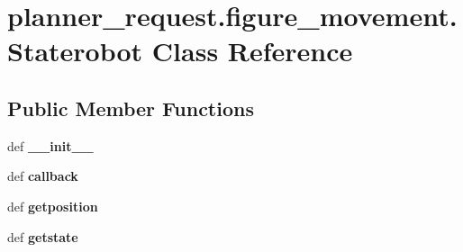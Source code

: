 \hypertarget{classplanner__request_1_1figure__movement_1_1_staterobot}{\section{planner\-\_\-request.\-figure\-\_\-movement.\-Staterobot \-Class \-Reference}
\label{classplanner__request_1_1figure__movement_1_1_staterobot}
}
\subsection*{\-Public \-Member \-Functions}
\begin{DoxyCompactItemize}
\item 
\hypertarget{classplanner__request_1_1figure__movement_1_1_staterobot_a55515374f53a462c7da7254240080a5d}{def {\bfseries \-\_\-\-\_\-init\-\_\-\-\_\-}}\label{classplanner__request_1_1figure__movement_1_1_staterobot_a55515374f53a462c7da7254240080a5d}

\item 
\hypertarget{classplanner__request_1_1figure__movement_1_1_staterobot_a9455dd9420eb177ac3cf6e13ccb6d09f}{def {\bfseries callback}}\label{classplanner__request_1_1figure__movement_1_1_staterobot_a9455dd9420eb177ac3cf6e13ccb6d09f}

\item 
\hypertarget{classplanner__request_1_1figure__movement_1_1_staterobot_a6f72bec6ec44915493a1bee1cf768113}{def {\bfseries getposition}}\label{classplanner__request_1_1figure__movement_1_1_staterobot_a6f72bec6ec44915493a1bee1cf768113}

\item 
\hypertarget{classplanner__request_1_1figure__movement_1_1_staterobot_a62eaf55852cb00b185c0465c045445b5}{def {\bfseries getstate}}\label{classplanner__request_1_1figure__movement_1_1_staterobot_a62eaf55852cb00b185c0465c045445b5}

\end{DoxyCompactItemize}
